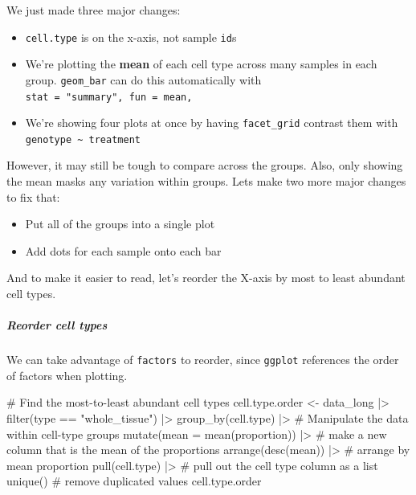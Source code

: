 \documentclass[
  letterpaper,
  DIV=11,
  numbers=noendperiod]{scrreprt}
\let\oldsubparagraph\subparagraph
\renewcommand{\subparagraph}[1]{\oldsubparagraph{#1}\mbox{}}
\newenvironment{Shaded}{\begin{snugshade}}{\end{snugshade}}
\newcommand{\AttributeTok}[1]{\textcolor[rgb]{0.40,0.45,0.13}{#1}}
\newcommand{\CommentTok}[1]{\textcolor[rgb]{0.37,0.37,0.37}{#1}}
\newcommand{\FunctionTok}[1]{\textcolor[rgb]{0.28,0.35,0.67}{#1}}
\newcommand{\NormalTok}[1]{\textcolor[rgb]{0.00,0.23,0.31}{#1}}
\newcommand{\OtherTok}[1]{\textcolor[rgb]{0.00,0.23,0.31}{#1}}
\newcommand{\SpecialCharTok}[1]{\textcolor[rgb]{0.37,0.37,0.37}{#1}}
\newcommand{\StringTok}[1]{\textcolor[rgb]{0.13,0.47,0.30}{#1}}
\providecommand{\tightlist}{%
  \setlength{\itemsep}{0pt}\setlength{\parskip}{0pt}}\usepackage{longtable,booktabs,array}
\begin{document}
We just made three major changes:

\begin{itemize}
\tightlist
\item
  \texttt{cell.type} is on the x-axis, not sample \texttt{id}s
\item
  We're plotting the \textbf{mean} of each cell type across many samples
  in each group. \texttt{geom\_bar} can do this automatically with
  \texttt{stat\ =\ "summary",\ fun\ =\ mean,}
\item
  We're showing four plots at once by having \texttt{facet\_grid}
  contrast them with \texttt{genotype\ \textasciitilde{}\ treatment}
\end{itemize}

However, it may still be tough to compare across the groups. Also, only
showing the mean masks any variation within groups. Lets make two more
major changes to fix that:

\begin{itemize}
\tightlist
\item
  Put all of the groups into a single plot
\item
  Add dots for each sample onto each bar
\end{itemize}

And to make it easier to read, let's reorder the X-axis by most to least
abundant cell types.

\subparagraph{Reorder cell types}\label{reorder-cell-types}

We can take advantage of \texttt{factors} to reorder, since
\texttt{ggplot} references the order of factors when plotting.

\begin{Shaded}
\begin{Highlighting}[]
\CommentTok{\# Find the most{-}to{-}least abundant cell types}
\NormalTok{cell.type.order }\OtherTok{\textless{}{-}}\NormalTok{ data\_long }\SpecialCharTok{|\textgreater{}} 
  \FunctionTok{filter}\NormalTok{(type }\SpecialCharTok{==} \StringTok{"whole\_tissue"}\NormalTok{) }\SpecialCharTok{|\textgreater{}} 
  \FunctionTok{group\_by}\NormalTok{(cell.type) }\SpecialCharTok{|\textgreater{}} \CommentTok{\# Manipulate the data within cell{-}type groups}
  \FunctionTok{mutate}\NormalTok{(}\AttributeTok{mean =} \FunctionTok{mean}\NormalTok{(proportion)) }\SpecialCharTok{|\textgreater{}} \CommentTok{\# make a new column that is the mean of the proportions }
  \FunctionTok{arrange}\NormalTok{(}\FunctionTok{desc}\NormalTok{(mean)) }\SpecialCharTok{|\textgreater{}} \CommentTok{\# arrange by mean proportion}
  \FunctionTok{pull}\NormalTok{(cell.type) }\SpecialCharTok{|\textgreater{}} \CommentTok{\# pull out the cell type column as a list}
  \FunctionTok{unique}\NormalTok{() }\CommentTok{\# remove duplicated values}
\NormalTok{cell.type.order}
\end{Highlighting}
\end{Shaded}
\end{document}

